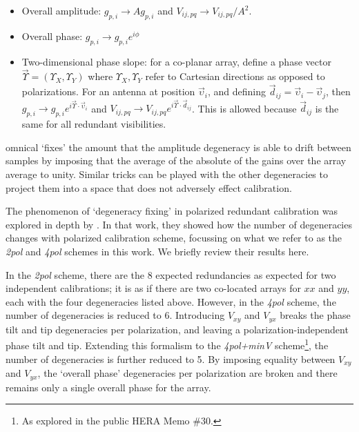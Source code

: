 \begin{itemize}
\item Overall amplitude: $g_{p,i} \rightarrow A g_{p,i}$ and $V_{ij,pq} \rightarrow V_{ij,pq}/A^2$.
\item Overall phase: $g_{p,i} \rightarrow g_{p,i}e^{i\phi}$
\item Two-dimensional phase slope: for a co-planar array, define a phase vector $\vec{\Upsilon} = (\Upsilon_X,\Upsilon_Y)$ where $\Upsilon_X,\Upsilon_Y$ refer to Cartesian directions as opposed to polarizations. For an antenna at position $\vec{\upsilon}_i$, and defining $\vec{d}_{ij} = \vec{\upsilon}_i - \vec{\upsilon}_j$, then $g_{p,i} \rightarrow g_{p,i}e^{i\vec{\Upsilon}\cdot\vec{\upsilon}_i}$ and $V_{ij,pq} \rightarrow V_{ij,pq}e^{i\vec{\Upsilon}\cdot\vec{d}_{ij}}$. This is allowed because $\vec{d}_{ij}$ is the same for all redundant visibilities.
\end{itemize}

{\sc omnical} `fixes' the amount that the amplitude degeneracy is able to drift between samples by imposing that the average of the absolute of the gains over the array average to unity. Similar tricks can be played with the other degeneracies to project them into a space that does not adversely effect calibration.

The phenomenon of `degeneracy fixing' in polarized redundant calibration was explored in depth by \citet{Dillon.17}. In that work, they showed how the number of degeneracies changes with polarized calibration scheme, focussing on what we refer to as the \textit{2pol} and \textit{4pol} schemes in this work. We briefly review their results here. 

In the \textit{2pol} scheme, there are the 8 expected redundancies as expected for two independent calibrations; it is as if there are two co-located arrays for $xx$ and $yy$, each with the four degeneracies listed above. However, in the \textit{4pol} scheme, the number of degeneracies is reduced to 6. Introducing $V_{xy}$ and $V_{yx}$ breaks the phase tilt and tip degeneracies per polarization, and leaving a polarization-independent phase tilt and tip. Extending this formalism to the \textit{4pol+minV} scheme\footnote{As explored in the public HERA Memo \#30.}, the number of degeneracies is further reduced to 5. By imposing equality between $V_{xy}$ and $V_{yx}$, the `overall phase' degeneracies per polarization are broken and there remains only a single overall phase for the array.

